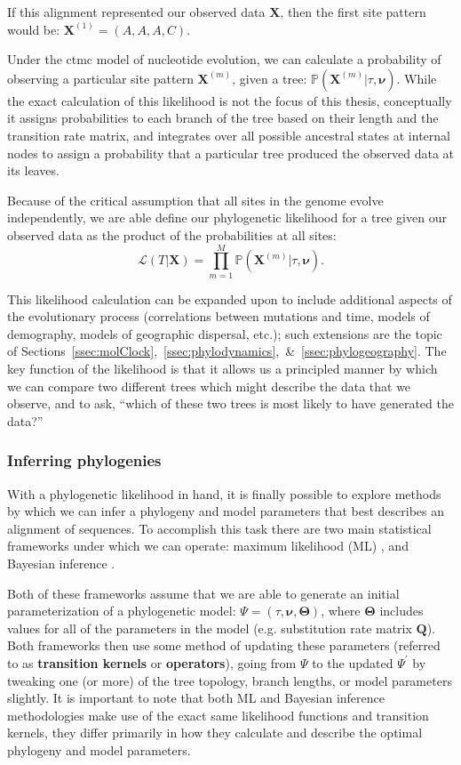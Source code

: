 If this alignment represented our observed data $\mathbf{X}$, then the first site pattern would be: $\mathbf{X}^(1) = (A, A, A, C)$.

Under the \gls{ctmc} model of nucleotide evolution, we can calculate a probability of observing a particular site pattern $\mathbf{X}^{(m)}$, given a tree: $\mathbb{P}(\mathbf{X}^{(m)} | \tau, \mathbf{\nu})$.
While the exact calculation of this likelihood is not the focus of this thesis, conceptually it assigns probabilities to each branch of the tree based on their length and the transition rate matrix, and integrates over all possible ancestral states at internal nodes to assign a probability that a particular tree produced the observed data at its leaves.

Because of the critical assumption that all sites in the genome evolve independently, we are able define our phylogenetic likelihood for a tree given our observed data as the product of the probabilities at all sites:
\begin{equation}\label{eq:likelihood}
  \mathcal{L}(T | \mathbf{X}) = \prod_{m=1}^M \mathbb{P}(\mathbf{X}^{(m)} | \tau, \mathbf{\nu}). 
\end{equation}

This likelihood calculation can be expanded upon to include additional aspects of the evolutionary process (correlations between mutations and time, models of demography, models of geographic dispersal, etc.); such extensions are the topic of Sections~\ref{ssec:molClock},~\ref{ssec:phylodynamics},~\&~\ref{ssec:phylogeography}.
The key function of the likelihood is that it allows us a principled manner by which we can compare two different trees which might describe the data that we observe, and to ask, ``which of these two trees is most likely to have generated the data?''

\subsubsection{Inferring phylogenies}
With a phylogenetic likelihood in hand, it is finally possible to explore methods by which we can infer a phylogeny and model parameters that best describes an alignment of sequences.
To accomplish this task there are two main statistical frameworks under which we can operate: maximum likelihood (ML) \citep{hasegawa1991maximum}, and Bayesian inference \citep{suchard2018bayesian}.

Both of these frameworks assume that we are able to generate an initial parameterization of a phylogenetic model: $\Psi = (\tau, \mathbf{\nu}, \mathbf{\Theta})$, where $\mathbf{\Theta}$ includes values for all of the parameters in the model (e.g. substitution rate matrix $\mathbf{Q}$).
Both frameworks then use some method of updating these parameters (referred to as \textbf{transition kernels} or \textbf{operators}), going from $\Psi$ to the updated $\Psi^{\prime}$ by tweaking one (or more) of the tree topology, branch lengths, or model parameters slightly.
It is important to note that both ML and Bayesian inference methodologies make use of the exact same likelihood functions and transition kernels, they differ primarily in how they calculate and describe the optimal phylogeny and model parameters.

